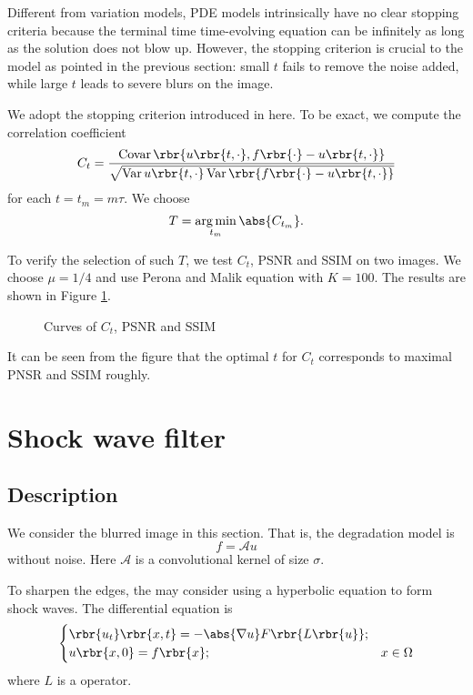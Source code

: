 \documentclass[english, nochinese]{pnote}
\DeclareMathOperator\opvar{\mathrm{Var}}
\DeclareMathOperator\opcovar{\mathrm{Covar}}
\begin{document}
Different from variation models, PDE models intrinsically have no clear stopping criteria because the terminal time time-evolving equation can be infinitely as long as the solution does not blow up. However, the stopping criterion is crucial to the model as pointed in the previous section: small $t$ fails to remove the noise added, while large $t$ leads to severe blurs on the image.

We adopt the stopping criterion introduced in \parencite{tsiotsios_choice_2013} here. To be exact, we compute the correlation coefficient
\begin{equation}
C_t = \frac{ \opcovar \rbr{ u \rbr{ t, \cdot }, f \rbr{\cdot} - u \rbr{ t, \cdot } } }{\sqrt{ \opvar u \rbr{ t, \cdot } \opvar \rbr{ f \rbr{\cdot} - u \rbr{ t, \cdot } } }}
\end{equation}
for each $ t = t_m = m \tau $. We choose
\begin{equation}
T = \mathop{\arg\min}_{t_m} \abs{C_{t_m}}.
\end{equation}

To verify the selection of such $T$, we test $C_t$, PSNR and SSIM on two images. We choose $ \mu = 1 / 4 $ and use Perona and Malik equation with $ K = 100 $. The results are shown in Figure \ref{Fig:Corr}.

\begin{figure}[htb]
\centering
\scalebox{0.75}{}
\caption{Curves of $C_t$, PSNR and SSIM}
\label{Fig:Corr}
\end{figure}

It can be seen from the figure that the optimal $t$ for $C_t$ corresponds to maximal PNSR and SSIM roughly.

\section{Shock wave filter}

\subsection{Description}

We consider the blurred image in this section. That is, the degradation model is
\begin{equation}
f = \mathcal{A} u
\end{equation}
without noise. Here $\mathcal{A}$ is a convolutional kernel of size $\sigma$.

To sharpen the edges, the may consider using a hyperbolic equation to form shock waves. The differential equation is
\begin{equation} \label{Eq:Hyp}
\begin{cases}
\rbr{u_t} \rbr{ x, t } = -\abs{ \nabla u } F \rbr{ L \rbr{u} }; \\
u \rbr{ x, 0 } = f \rbr{x}; & x \in \Omega
\end{cases}
\end{equation}
where $L$ is a operator.
\end{document}
